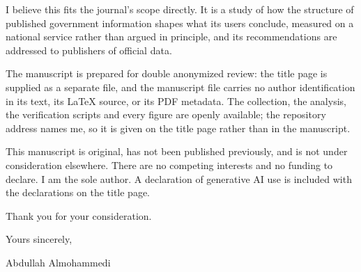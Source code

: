 \documentclass[10.5pt]{letter}
\begin{document}
\vspace{0.5em}
I believe this fits the journal's scope directly. It is a study of how the
structure of published government information shapes what its users conclude,
measured on a national service rather than argued in principle, and its
recommendations are addressed to publishers of official data.

\vspace{0.5em}
The manuscript is prepared for double anonymized review: the title page is
supplied as a separate file, and the manuscript file carries no author
identification in its text, its LaTeX source, or its PDF metadata. The
collection, the analysis, the verification scripts and every figure are openly
available; the repository address names me, so it is given on the title page
rather than in the manuscript.

\vspace{0.5em}
This manuscript is original, has not been published previously, and is not
under consideration elsewhere. There are no competing interests and no funding
to declare. I am the sole author. A declaration of generative AI use is
included with the declarations on the title page.

\vspace{0.9em}
\noindent Thank you for your consideration.

\vspace{0.9em}
\noindent Yours sincerely,

\vspace{0.6em}
\noindent Abdullah Almohammedi
\end{document}
